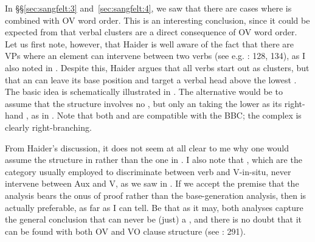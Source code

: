 \documentclass[output=paper, colorlinks, citecolor=brown]{langscibook}
\begin{document}
In §§\ref{sec:sangfelt:3} and~\ref{sec:sangfelt:4}, we saw that there are cases where  is combined with OV word order. This is an interesting conclusion, since it could be expected from \citet{Haider2010} that verbal clusters are a direct consequence of OV word order. Let us first note, however, that Haider is well aware of the fact that there are  VPs where an element can intervene between two verbs (see e.g. \citealt{Haider2013}: 128, 134), as I also noted in . Despite this, Haider argues that all verbs start out as clusters, but that an  can leave its base position and target a verbal head above the lowest  \parencites[290–291]{Haider2010}[134]{Haider2013}. The basic idea is schematically illustrated in . The alternative would be to assume that the structure involves no , but only an  taking the lower  as its right-hand , as in . Note that both  and  are compatible with the BBC; the complex  is clearly right-branching.

\settowidth{}
\ea
\label{ex:sangfelt:30}
 
 
\z 
\z

From Haider’s discussion, it does not seem at all clear to me why one would assume the structure in  rather than the one in . I also note that , which are the category usually employed to discriminate between verb  and V-in-situ, never intervene between Aux and V, as we saw in . If we accept the premise that the  analysis bears the onus of proof rather than the base-generation analysis, then  is actually preferable, as far as I can tell. Be that as it may, both analyses capture the general conclusion that  can never be (just) a , and there is no doubt that it can be found with both OV and VO clause structure (see \citealt{Haider2010}: 291).
\end{document}

